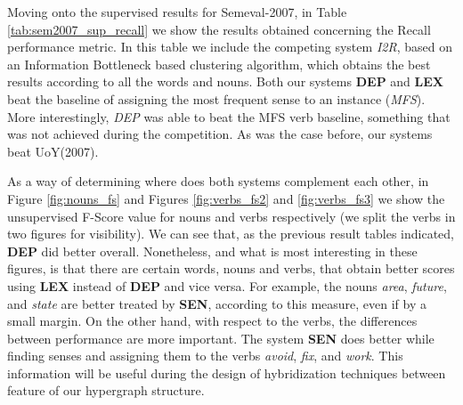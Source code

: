 Moving onto the supervised results for Semeval-2007, in Table \ref{tab:sem2007_sup_recall} we show the results obtained concerning the Recall performance metric.  In this table we include the competing system \textit{I2R}, based on an Information Bottleneck based clustering algorithm, which obtains the best results according to all the words and nouns. Both our systems \textbf{DEP} and \textbf{LEX} beat the baseline of assigning the most frequent sense to an instance (\textit{MFS}). More interestingly, \textit{DEP} was able to beat the MFS verb baseline, something that was not achieved during the competition. As was the case before, our systems beat UoY(2007).




As a way of determining where does both systems complement each other, in Figure \ref{fig:nouns_fs} and Figures  \ref{fig:verbs_fs2} and \ref{fig:verbs_fs3} we show the unsupervised F-Score value for nouns and verbs respectively (we split the verbs in two figures for visibility). We can see that, as the previous result tables indicated, \textbf{DEP} did better overall. Nonetheless, and what is most interesting in these figures, is that there are certain words, nouns and verbs, that obtain better scores using \textbf{LEX} instead of \textbf{DEP} and vice versa. For example, the nouns \textit{area}, \textit{future}, and \textit{state} are better treated by \textbf{SEN}, according to this measure, even if by a small margin. On the other hand, with respect to the verbs, the differences between performance are more important. The system \textbf{SEN} does better while finding senses and assigning them to the verbs \textit{avoid}, \textit{fix}, and \textit{work}. This information will be useful during the design of hybridization techniques between feature of our hypergraph structure.

 


